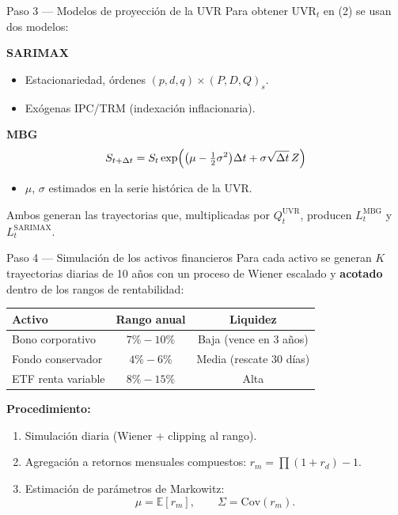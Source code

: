 \documentclass[10pt]{beamer}
\begin{document}
\begin{frame}{Paso 3 — Modelos de proyección de la UVR}
\small
Para obtener \(\mathrm{UVR}_t\) en (2) se usan dos modelos:

\vspace{0.1cm}
\textbf{SARIMAX}
\begin{itemize}
    \item Estacionariedad, órdenes \((p,d,q)\times(P,D,Q)_s\).
    \item Exógenas IPC/TRM (indexación inflacionaria).
\end{itemize}

\textbf{MBG}
\begin{equation*}
S_{t+\Delta t}=S_t\exp\Bigl(\bigl(\mu-\tfrac12\sigma^2\bigr)\Delta t+\sigma\sqrt{\Delta t}\,Z\Bigr)
\end{equation*}
\begin{itemize}
    \item \(\mu\), \(\sigma\) estimados en la serie histórica de la UVR.
\end{itemize}

Ambos generan las trayectorias que, multiplicadas por \(Q_t^{\mathrm{UVR}}\), producen \(L_t^{\mathrm{MBG}}\) y \(L_t^{\mathrm{SARIMAX}}\).
\end{frame}

\begin{frame}{Paso 4 — Simulación de los activos financieros}
\small
Para cada activo se generan \(K\) trayectorias diarias de 10 años con un proceso de Wiener
escalado y \textbf{acotado} dentro de los rangos de rentabilidad:

\begin{center}
\renewcommand{\arraystretch}{1.15}
\begin{tabular}{|l|c|c|}
\hline
\textbf{Activo} & \textbf{Rango anual} & \textbf{Liquidez} \\
\hline
Bono corporativo & \(7\%{-}10\%\) & Baja (vence en 3 años) \\
Fondo conservador & \(4\%{-}6\%\) & Media (rescate 30 días) \\
ETF renta variable & \(8\%{-}15\%\) & Alta \\
\hline
\end{tabular}
\end{center}

\vspace{0.15cm}
\textbf{Procedimiento:}
\begin{enumerate}
    \item Simulación diaria (Wiener + clipping al rango).
    \item Agregación a retornos mensuales compuestos: \(r_m=\prod(1+r_d)-1\).
    \item Estimación de parámetros de Markowitz:
    \[
    \mu=\mathbb{E}[r_m],\qquad \Sigma=\mathrm{Cov}(r_m).
    \]
\end{enumerate}
\end{frame}
\end{document}
